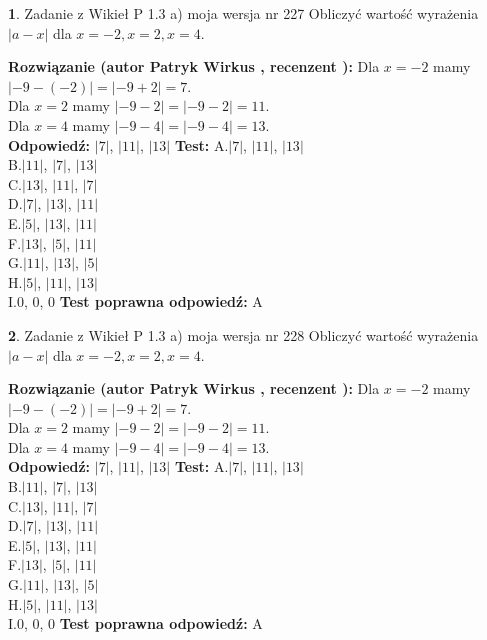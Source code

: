 \documentclass[12pt, a4paper]{article}
\theoremstyle{definition} %
\newtheorem{zad}{}
\newcommand{\zadStart}[1]{\begin{zad}#1\newline}
\newcommand{\zadStop}{\end{zad}}
\newcommand{\rozwStart}[2]{\noindent \textbf{Rozwiązanie (autor #1 , recenzent #2): }\newline}
\newcommand{\rozwStop}{\newline}
\newcommand{\odpStart}{\noindent \textbf{Odpowiedź:}\newline}
\newcommand{\odpStop}{\newline}
\newcommand{\testStart}{\noindent \textbf{Test:}\newline}
\newcommand{\testStop}{\newline}
\newcommand{\kluczStart}{\noindent \textbf{Test poprawna odpowiedź:}\newline}
\newcommand{\kluczStop}{\newline}
\begin{document}
\zadStart{Zadanie z Wikieł P 1.3 a) moja wersja nr 227}
Obliczyć wartość wyrażenia $|a - x|$ dla $x=-2,x=2,x=4$.
\zadStop
\rozwStart{Patryk Wirkus}{}
Dla $x = -2$ mamy $|-9 - (-2)| = |-9 + 2| = 7$.\\
Dla $x = 2$ mamy $|-9 - 2| = |-9 - 2| = 11$.\\
Dla $x = 4$ mamy $|-9 - 4| = |-9 - 4| = 13$.\\
\rozwStop
\odpStart
$|7|$, $|11|$, $|13|$
\odpStop
\testStart
A.$|7|$, $|11|$, $|13|$\\
B.$|11|$, $|7|$, $|13|$\\
C.$|13|$, $|11|$, $|7|$\\
D.$|7|$, $|13|$, $|11|$\\
E.$|5|$, $|13|$, $|11|$\\
F.$|13|$, $|5|$, $|11|$\\
G.$|11|$, $|13|$, $|5|$\\
H.$|5|$, $|11|$, $|13|$\\
I.$0$, $0$, $0$
\testStop
\kluczStart
A
\kluczStop



\zadStart{Zadanie z Wikieł P 1.3 a) moja wersja nr 228}
Obliczyć wartość wyrażenia $|a - x|$ dla $x=-2,x=2,x=4$.
\zadStop
\rozwStart{Patryk Wirkus}{}
Dla $x = -2$ mamy $|-9 - (-2)| = |-9 + 2| = 7$.\\
Dla $x = 2$ mamy $|-9 - 2| = |-9 - 2| = 11$.\\
Dla $x = 4$ mamy $|-9 - 4| = |-9 - 4| = 13$.\\
\rozwStop
\odpStart
$|7|$, $|11|$, $|13|$
\odpStop
\testStart
A.$|7|$, $|11|$, $|13|$\\
B.$|11|$, $|7|$, $|13|$\\
C.$|13|$, $|11|$, $|7|$\\
D.$|7|$, $|13|$, $|11|$\\
E.$|5|$, $|13|$, $|11|$\\
F.$|13|$, $|5|$, $|11|$\\
G.$|11|$, $|13|$, $|5|$\\
H.$|5|$, $|11|$, $|13|$\\
I.$0$, $0$, $0$
\testStop
\kluczStart
A
\kluczStop
\end{document}
